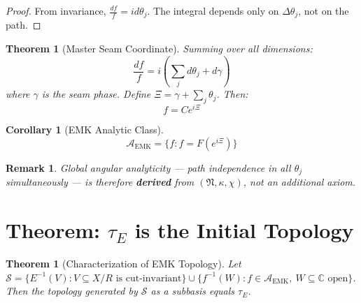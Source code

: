 \documentclass[12pt]{article}
\newtheorem{theorem}[axiom]{Theorem}
\newtheorem{corollary}[axiom]{Corollary}
\newtheorem{remark}[axiom]{Remark}
\newcommand{\EMK}{\mathrm{EMK}}
\newcommand{\A}{\mathcal{A}}
\begin{document}
\begin{proof}
From invariance, \(\frac{df}{f} = i d\theta_j\). The integral depends only on \(\Delta \theta_j\), not on the path.
\end{proof}

\begin{theorem}[Master Seam Coordinate]
Summing over all dimensions:
\[
\frac{df}{f} = i\left(\sum_j d\theta_j + d\gamma\right)
\]
where \(\gamma\) is the seam phase. Define \(\Xi = \gamma + \sum_j \theta_j\). Then:
\[
f = C e^{i\Xi}
\]
\end{theorem}

\begin{corollary}[EMK Analytic Class]
\[
\mathcal{A}_{\EMK} = \{ f : f = F(e^{i\Xi}) \}
\]
\end{corollary}

\begin{remark}
Global angular analyticity — path independence in all \(\theta_j\) simultaneously — is therefore \textbf{derived} from \((\mathfrak N, \kappa, \chi)\), not an additional axiom.
\end{remark}
\section{Theorem: \(\tau_E\) is the Initial Topology}

\begin{theorem}[Characterization of EMK Topology]
Let \(\mathcal{S} = \{ E^{-1}(V) : V \subseteq X/R \text{ is cut-invariant} \} \cup \{ f^{-1}(W) : f \in \A_{\EMK},\ W \subseteq \mathbb{C} \text{ open} \}\).
Then the topology generated by \(\mathcal{S}\) as a subbasis equals \(\tau_E\).
\end{theorem}
\end{document}
